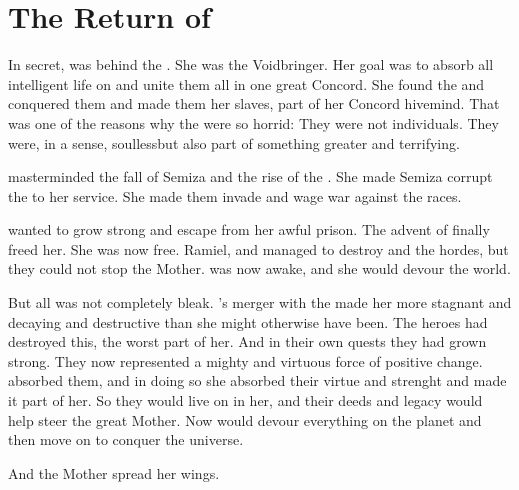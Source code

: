 \section[The Return of Tyrasshana]{The Return of \Tiamat}
In secret, \Tiamat was behind the \resphain. 
She was the Voidbringer.
Her goal was to absorb all intelligent life on \Miith and unite them all in one great Concord. 
She found the \banes and conquered them and made them her slaves, part of her Concord hivemind. 
That was one of the reasons why the \banes were so horrid: 
They were not individuals. 
They were, in a sense, soulless\dash but also part of something greater and terrifying. 

\Tiamat masterminded the fall of Semiza and the rise of the \resphain.
She made Semiza corrupt the \resphain to her service. 
She made them invade \Miith and wage war against the \ophidian races. 

\Tiamat wanted to grow strong and escape from her awful prison. 
The advent of \Lithrim finally freed her. 
She was now free. 
Ramiel, \Azeraid and \Iscrafel managed to destroy \Daggerrain and the \bane hordes, but they could not stop the Mother. 
\Tiamat was now awake, and she would devour the world. 

But all was not completely bleak. 
\Tiamat's merger with the \banes made her more stagnant and decaying and destructive than she might otherwise have been.
The heroes had destroyed this, the worst part of her. 
And in their own quests they had grown strong.
They now represented a mighty and virtuous force of positive change. 
\Tiamat absorbed them, and in doing so she absorbed their virtue and strenght and made it part of her.
So they would live on in her, and their deeds and legacy would help steer the great Mother. 
Now \Tiamat would devour everything on the planet and then move on to conquer the universe. 

And the Mother spread her wings. 






















